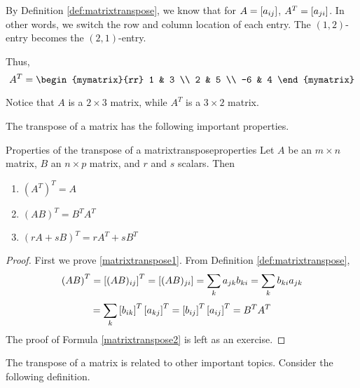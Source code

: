 \begin{solution}
By Definition \ref{def:matrixtranspose}, we know that for $A = \left[ a_{ij} \right]$, 
$A^T = \left[ a_{ji} \right]$. In other words, we switch the row and column
location of each entry. The $\left( 1, 2 \right)$-entry becomes the $\left( 2,1 \right)$-entry.

Thus, 
\begin{equation*}
A^T = 
 \begin{mymatrix}{rr}
1 & 3 \\
2 & 5 \\
-6 & 4
\end{mymatrix} 
\end{equation*}

Notice that $A$ is a $2 \times 3$ matrix, while $A^T$ is a $3 \times 2$ matrix. 
\end{solution}

The transpose of a matrix has the following important properties.

\begin{lemma}{Properties of the transpose of a matrix}{transposeproperties}
Let $A$ be an $m\times n$ matrix, $B$ an $n\times p$ matrix, and $r$ and $s$ scalars. Then
\begin{enumerate}
\item
$\left(A^{T}\right)^{T} = A$
\item
$\left( AB\right) ^{T}=B^{T}A^{T} $ \label{matrixtranspose1}
\item
$\left( rA+ sB\right) ^{T}=rA^{T}+ sB^{T}$  \label{matrixtranspose2}
\end{enumerate}
\end{lemma}

\begin{proof}
First we prove \ref{matrixtranspose1}. From Definition \ref{def:matrixtranspose},
\begin{equation*}
\left(AB\right)^{T} = \left[ (AB) _{ij} \right] ^{T}=\left[ (AB)_{ji} \right]=\sum_{k}a_{jk}b_{ki}= \sum_{k}b_{ki}a_{jk} 
\end{equation*}
\begin{equation*}
= \sum_{k}\left[ b_{ik}\right]^{T}\left[
a_{kj}\right]^{T}=\left[ b_{ij}\right] ^{T} \left[ a_{ij}\right]^{T} = B^{T}A^{T} 
\end{equation*}
The proof of Formula \ref{matrixtranspose2} is left as an exercise. 
\end{proof}

The transpose of a matrix is related to other important topics. Consider the following definition.  

